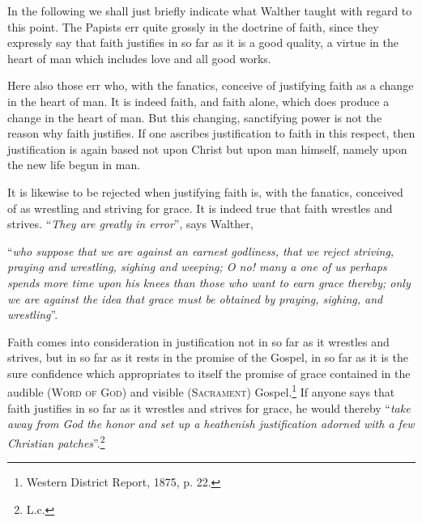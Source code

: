                 In the following we shall just briefly indicate what Walther taught with regard to this point.
\divider
                The Papists err quite grossly in the doctrine of faith, since they expressly say that faith justifies in so far as it is a good quality, a virtue in the heart of man which includes love and all good works.

                Here also those err who, with the fanatics, conceive of justifying faith as a change in the heart of man.  It is indeed faith, and faith alone, which does produce a change in the heart of man.  But this changing, sanctifying power is not the reason why faith justifies.  If one ascribes justification to faith in this respect, then justification is again based not upon Christ but upon man himself, namely upon the new life begun in man.

                It is likewise to be rejected when justifying faith is, with the fanatics, conceived of as wrestling and striving for grace.  It is indeed true that faith wrestles and strives.  “\textit{They are greatly in error}”, says Walther, \begin{displayquote}“\textit{who suppose that we are against an earnest godliness, that we reject striving, praying and wrestling, sighing and weeping; O no! many a one of us perhaps spends more time upon his knees than those who want to earn grace thereby; only we are against the idea that grace must be obtained by praying, sighing, and wrestling}”.\end{displayquote}  Faith comes into consideration in justification not in so far as it wrestles and strives, but in so far as it rests in the promise of the Gospel, in so far as it is the sure confidence which appropriates to itself the promise of grace contained in the audible {\scriptsize\textsc{(Word of God)}} and visible {\scriptsize\textsc{(Sacrament)}} Gospel.\footnote{Western District Report, 1875, p. 22.}  If anyone says that faith justifies in so far as it wrestles and strives for grace, he would thereby “\textit{take away from God the honor and set up a heathenish justification adorned with a few Christian patches}”.\footnote{L.c.}

